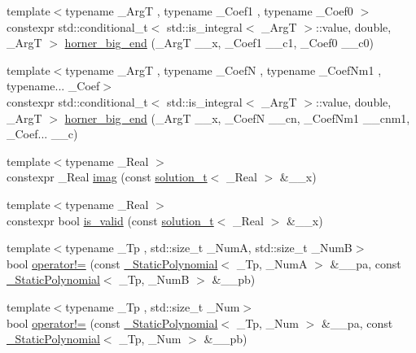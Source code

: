 \begin{DoxyCompactItemize}
{\footnotesize template$<$typename \+\_\+\+ArgT , typename \+\_\+\+Coef1 , typename \+\_\+\+Coef0 $>$ }\\constexpr std\+::conditional\+\_\+t$<$ std\+::is\+\_\+integral$<$ \+\_\+\+ArgT $>$\+::value, double, \+\_\+\+ArgT $>$ \hyperlink{namespace____gnu__cxx_a546a72f007105e3ba32df87d7463edf7}{horner\+\_\+big\+\_\+end} (\+\_\+\+ArgT \+\_\+\+\_\+x, \+\_\+\+Coef1 \+\_\+\+\_\+c1, \+\_\+\+Coef0 \+\_\+\+\_\+c0)
\item 
{\footnotesize template$<$typename \+\_\+\+ArgT , typename \+\_\+\+CoefN , typename \+\_\+\+Coef\+Nm1 , typename... \+\_\+\+Coef$>$ }\\constexpr std\+::conditional\+\_\+t$<$ std\+::is\+\_\+integral$<$ \+\_\+\+ArgT $>$\+::value, double, \+\_\+\+ArgT $>$ \hyperlink{namespace____gnu__cxx_afda9e3a1e351db85a89d4e6434576159}{horner\+\_\+big\+\_\+end} (\+\_\+\+ArgT \+\_\+\+\_\+x, \+\_\+\+CoefN \+\_\+\+\_\+cn, \+\_\+\+Coef\+Nm1 \+\_\+\+\_\+cnm1, \+\_\+\+Coef... \+\_\+\+\_\+c)
\item 
{\footnotesize template$<$typename \+\_\+\+Real $>$ }\\constexpr \+\_\+\+Real \hyperlink{namespace____gnu__cxx_a685dd0477f8454431bcfb404fa201c57}{imag} (const \hyperlink{namespace____gnu__cxx_ae20ea642de50eb361074c62676b0159c}{solution\+\_\+t}$<$ \+\_\+\+Real $>$ \&\+\_\+\+\_\+x)
\item 
{\footnotesize template$<$typename \+\_\+\+Real $>$ }\\constexpr bool \hyperlink{namespace____gnu__cxx_ac6649e26a3db551b4f945ccfcd3ce0a7}{is\+\_\+valid} (const \hyperlink{namespace____gnu__cxx_ae20ea642de50eb361074c62676b0159c}{solution\+\_\+t}$<$ \+\_\+\+Real $>$ \&\+\_\+\+\_\+x)
\item 
{\footnotesize template$<$typename \+\_\+\+Tp , std\+::size\+\_\+t \+\_\+\+NumA, std\+::size\+\_\+t \+\_\+\+NumB$>$ }\\bool \hyperlink{namespace____gnu__cxx_ad79bae6336788c58358fcf9fcd342cb9}{operator!=} (const \hyperlink{class____gnu__cxx_1_1__StaticPolynomial}{\+\_\+\+Static\+Polynomial}$<$ \+\_\+\+Tp, \+\_\+\+NumA $>$ \&\+\_\+\+\_\+pa, const \hyperlink{class____gnu__cxx_1_1__StaticPolynomial}{\+\_\+\+Static\+Polynomial}$<$ \+\_\+\+Tp, \+\_\+\+NumB $>$ \&\+\_\+\+\_\+pb)
\item 
{\footnotesize template$<$typename \+\_\+\+Tp , std\+::size\+\_\+t \+\_\+\+Num$>$ }\\bool \hyperlink{namespace____gnu__cxx_a18cd3b1685ac1bb1c3f323e451e796d1}{operator!=} (const \hyperlink{class____gnu__cxx_1_1__StaticPolynomial}{\+\_\+\+Static\+Polynomial}$<$ \+\_\+\+Tp, \+\_\+\+Num $>$ \&\+\_\+\+\_\+pa, const \hyperlink{class____gnu__cxx_1_1__StaticPolynomial}{\+\_\+\+Static\+Polynomial}$<$ \+\_\+\+Tp, \+\_\+\+Num $>$ \&\+\_\+\+\_\+pb)

\end{DoxyCompactItemize}
